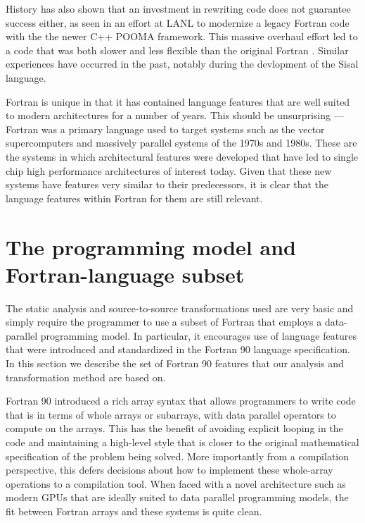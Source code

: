 \documentclass[10pt, conference, compsocconf]{IEEEtran}
\begin{document}
History has also shown that an investment in rewriting code does not guarantee
success either, as seen in an effort at LANL to modernize a legacy Fortran
code with the the newer C++ POOMA framework.  This massive overhaul effort led
to a code that was both slower and less flexible than the original Fortran
\cite{}.  Similar experiences have occurred in the past, notably during the
devlopment of the Sisal language.

Fortran is unique in that it has contained language features that are
well suited to modern architectures for a number of years.  This
should be unsurprising --- Fortran was a primary language used to
target systems such as the vector supercomputers and massively
parallel systems of the 1970s and 1980s.  These are the systems in
which architectural features were developed that have led to single
chip high performance architectures of interest today.  Given that
these new systems have features very similar to their predecessors, it
is clear that the language features within Fortran for them are still
relevant.


\section{The programming model and Fortran-language subset}

The static analysis and source-to-source transformations used are very
basic and simply require the programmer to use a subset of Fortran
that employs a data-parallel programming model.  In particular, it
encourages use of language features that were introduced and
standardized in the Fortran 90 language specification.  In this
section we describe the set of Fortran 90 features that our analysis
and transformation method are based on.

Fortran 90 introduced a rich array syntax that allows programmers to
write code that is in terms of whole arrays or subarrays, with data
parallel operators to compute on the arrays.  This has the benefit of
avoiding explicit looping in the code and maintaining a high-level
style that is closer to the original mathematical specification of the
problem being solved.  More importantly from a compilation
perspective, this defers decisions about how to implement these
whole-array operations to a compilation tool.  When faced with a novel
architecture such as modern GPUs that are ideally suited to data parallel
programming models, the fit between Fortran arrays and these systems is
quite clean.
\end{document}
